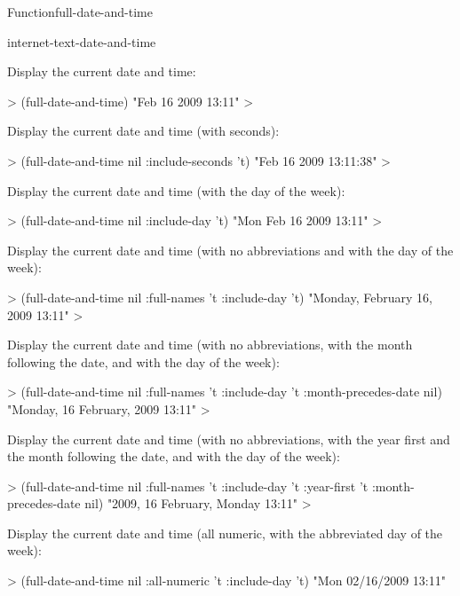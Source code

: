 \documentclass[10pt,twoside,english,pdftex]{article}
\begin{document}
\begin{functiondoc}{Function}{full-date-and-time}
\begin{alsos}{internet-text-date-and-time}
\end{alsos}

\fnexamples
Display the current date and time: 
%
\W\supp
\begin{example}
  > (full-date-and-time)
  "Feb 16 2009 13:11"
  >
\end{example}
%
Display the current date and time (with seconds):
%
\W\supp\notpretop
\begin{example}
  > (full-date-and-time nil :include-seconds 't)
  "Feb 16 2009 13:11:38"
  >
\end{example}
%
Display the current date and time (with the day of the week):
%
\W\supp\notpretop
\begin{example}
  > (full-date-and-time nil :include-day 't)
  "Mon Feb 16 2009 13:11"
  >
\end{example}
%
Display the current date and time (with no abbreviations and with the day of
the week):
%
\W\supp\notpretop
\begin{example}
  > (full-date-and-time nil :full-names 't :include-day 't)
  "Monday, February 16, 2009 13:11"
  >
\end{example}
%
Display the current date and time (with no abbreviations, with the month
following the date, and with the day of the week):
%
\W\supp\notpretop
\begin{example}
  > (full-date-and-time nil :full-names 't :include-day 't
                            :month-precedes-date nil)
  "Monday, 16 February, 2009 13:11"
  >
\end{example}
%
Display the current date and time (with no abbreviations, with the year first
and the month following the date, and with the day of the week):
%
\W\supp\notpretop
\begin{example}
  > (full-date-and-time nil :full-names 't :include-day 't
                            :year-first 't :month-precedes-date nil)
  "2009, 16 February, Monday 13:11"
  >
\end{example}
%
Display the current date and time (all numeric, with the abbreviated day of
the week):
%
\W\supp\notpretop
\begin{example}
  > (full-date-and-time nil :all-numeric 't :include-day 't)
  "Mon 02/16/2009 13:11"

\end{example}
\end{functiondoc}
\end{document}
